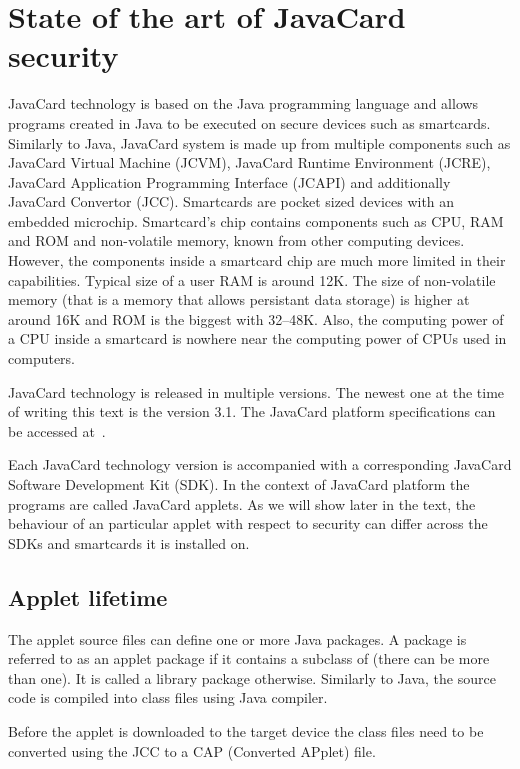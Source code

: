 \documentclass{../llncs/llncs}
\begin{document}
\section{State of the art of JavaCard security\label{sec:state-of-the-art}}
JavaCard technology is based on the Java programming language and allows programs created in Java to be executed on secure devices such as smartcards. Similarly to Java, JavaCard system is made up from multiple components such as JavaCard Virtual Machine (JCVM), JavaCard Runtime Environment (JCRE), JavaCard Application Programming Interface (JCAPI) and additionally JavaCard Convertor (JCC).  Smartcards are pocket sized devices with an embedded microchip. Smartcard's chip contains components such as CPU, RAM and ROM and non-volatile memory, known from other computing devices. However, the components inside a smartcard chip are much more limited in their capabilities. Typical size of a user RAM is around 12K. The size of non-volatile memory (that is a memory that allows persistant data storage) is higher at around 16K and ROM is the biggest with 32--48K. Also, the computing power of a CPU inside a smartcard is nowhere near the computing power of CPUs used in computers.

JavaCard technology is released in multiple versions. The newest one at the time of writing this text is the version 3.1. The JavaCard platform specifications can be accessed at~\cite{jcspecs31download}.

Each JavaCard technology version is accompanied with a corresponding JavaCard Software Development Kit (SDK). In the context of JavaCard platform the programs are called JavaCard applets. As we will show later in the text, the behaviour of an particular applet with respect to security can differ across the SDKs and smartcards it is installed on.

    \subsection{Applet lifetime}
The applet source files can define one or more Java packages. A package is referred to as an applet package if it contains a subclass of  (there can be more than one). It is called a library package otherwise.  Similarly to Java, the source code is compiled into class files using Java compiler.

Before the applet is downloaded to the target device the class files need to be converted using the JCC to a CAP (Converted APplet) file.
\end{document}
